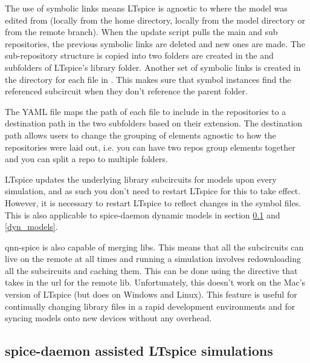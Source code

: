 The use of symbolic links means LTspice is agnostic to where the model was edited from
(locally from the home directory, locally from the model directory or from the remote branch).
When the update script pulls the main and sub repositories, the previous symbolic links are deleted and new ones are 
made. The sub-repository structure is copied into two  folders are created in the  and  
subfolders of LTspice's library folder. Another set of symbolic links is created in the
 directory for each file in . This makes sure that symbol
instances find the referenced subcircuit when they don't reference the parent 
folder.

The YAML file maps the path of each file to include in the repositories to a destination path in the two
 subfolders based on their extension. 
The destination path allows users to change the grouping of elements agnostic to how the repositories
were laid out, i.e. you can have two repos group elements together and you can split a
repo to multiple folders. 

LTspice updates the underlying library subcircuits for models upon every simulation,
and as such you don't need to restart LTspice for this to take effect. However,
it is necessary to restart LTspice to reflect changes in the symbol files. This is 
also applicable to spice-daemon dynamic models in section \ref{sd_models} and \ref{dyn_models}.

qnn-spice is also capable of merging libs. This means that all the subcircuits can live
on the remote at all times and running a simulation involves redownloading all the 
subcircuits and caching them. This can be done using the  directive that takes
in the url for the remote lib.
Unfortunately, this doesn't work on the Mac's version of LTspice  (but does on
Windows and Linux). This feature is useful for continually changing library files in 
a rapid development environments and for syncing models onto new devices without 
any overhead.



\subsection{spice-daemon assisted LTspice simulations}\label{sd_models}

